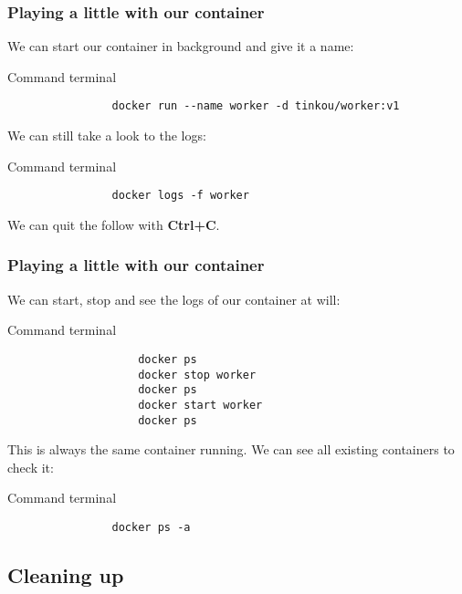 	\begin{frame}[fragile]
		\frametitle{Playing a little with our container}
		
		We can start our container in background and give it a name:
		\begin{block}{Command terminal}
			\begin{verbatim}
				docker run --name worker -d tinkou/worker:v1
			\end{verbatim}
		\end{block}
		
		\bigskip
		We can still take a look to the logs:
		\begin{block}{Command terminal}
			\begin{verbatim}
				docker logs -f worker
			\end{verbatim}
		\end{block}
		We can quit the follow with \textbf{Ctrl+C}.

	\end{frame}
	
	\begin{frame}[fragile]
		\frametitle{Playing a little with our container}
		
		We can start, stop and see the logs of our container at will:
		\begin{block}{Command terminal}
			\begin{small}
				\begin{verbatim}
					docker ps
					docker stop worker
					docker ps
					docker start worker
					docker ps
				\end{verbatim}
			\end{small}
		\end{block}
		
		\bigskip
		This is always the same container running. We can see all existing containers to check it:
		\begin{block}{Command terminal}
			\begin{verbatim}
				docker ps -a
			\end{verbatim}
		\end{block}

	\end{frame}
	
\subsection{Cleaning up}	
	
